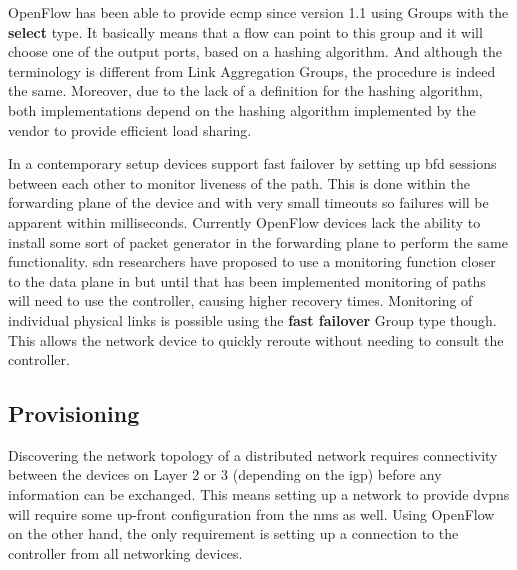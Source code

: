 OpenFlow has been able to provide \ac{ecmp} since version 1.1 using Groups with the \textbf{select} type. It basically means that a flow can point to this group and it will choose one of the output ports, based on a hashing algorithm. And although the terminology is different from Link Aggregation Groups, the procedure is indeed the same. Moreover, due to the lack of a definition for the hashing algorithm, both implementations depend on the hashing algorithm implemented by the vendor to provide efficient load sharing.

In a contemporary setup devices support fast failover by setting up \ac{bfd} sessions between each other to monitor liveness of the path. This is done within the forwarding plane of the device and with very small timeouts so failures will be apparent within milliseconds. Currently OpenFlow devices lack the ability to install some sort of packet generator in the forwarding plane to perform the same functionality. \ac{sdn} researchers have proposed to use a monitoring function closer to the data plane in \cite{scalable-fault} but until that has been implemented monitoring of paths will need to use the controller, causing higher recovery times. Monitoring of individual physical links is possible using the \textbf{fast failover} Group type though. This allows the network device to quickly reroute without needing to consult the controller.





\subsection{Provisioning} %
\label{sub:provisioning}

Discovering the network topology of a distributed network requires connectivity between the devices on Layer 2 or 3 (depending on the \ac{igp}) before any information can be exchanged. This means setting up a network to provide \acp{dvpn} will require some up-front configuration from the \ac{nms} as well. Using OpenFlow on the other hand, the only requirement is setting up a connection to the controller from all networking devices. 

